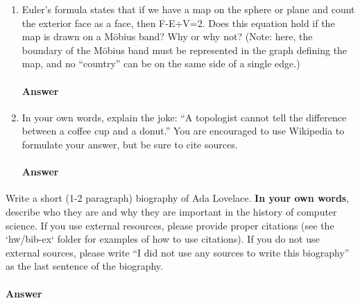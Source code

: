 \documentclass{article}
\begin{document}
\begin{enumerate}
    \item Euler's formula states that if we have a map on the sphere or plane
        and count the exterior face as a face, then F-E+V=2.  Does this equation
        hold if the map is drawn on a M\"obius band? Why or why not? (Note:
        here, the boundary of the M\"obius band must be represented in the graph
        defining the map, and no ``country'' can be on the same side of a single
        edge.)

        \paragraph{Answer}

    \item In your own words, explain the joke: ``A topologist cannot tell the
        difference between a coffee cup and a donut.''  You are encouraged to
        use Wikipedia to formulate your answer, but be sure to cite sources.

        \paragraph{Answer}

\end{enumerate}

\collab{\todo{}}

Write a short (1-2 paragraph) biography of Ada Lovelace.
\textbf{In your own words}, describe who they are and why they are important in
the history of computer science.  If you use external resources, please provide
proper citations (see the `hw/bib-ex` folder for examples of how to use
citations). If you do not use external sources, please write ``I did not
use any sources to write this biography'' as the last sentence of the
biography.

\paragraph{Answer}


\newpage


\end{document}

